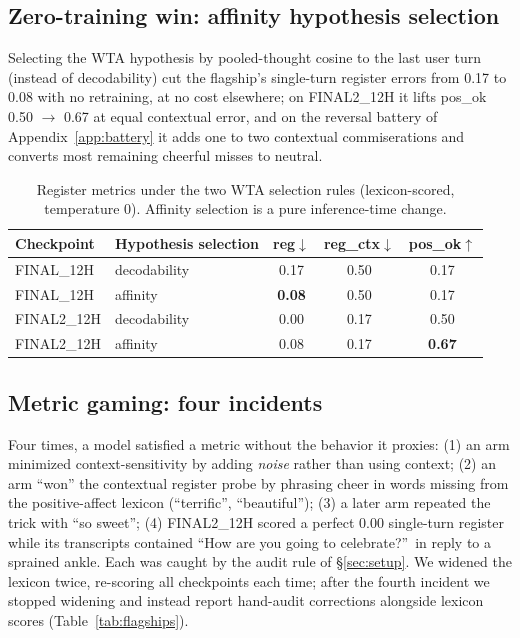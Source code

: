 \documentclass[11pt]{article}
\begin{document}
\subsection{Zero-training win: affinity hypothesis selection}
\label{sec:affinity}
Selecting the WTA hypothesis by pooled-thought cosine to the last user turn
(instead of decodability) cut the flagship's single-turn register errors from
0.17 to 0.08 with no retraining, at no cost elsewhere; on FINAL2\_12H it
lifts pos\_ok 0.50 $\to$ 0.67 at equal contextual error, and on the reversal
battery of Appendix~\ref{app:battery} it adds one to two contextual
commiserations and converts most remaining cheerful misses to neutral.

\begin{table}[h]
\centering
\small
\begin{tabular}{llccc}
\toprule
Checkpoint & Hypothesis selection & reg$\downarrow$ & reg\_ctx$\downarrow$ & pos\_ok$\uparrow$ \\
\midrule
FINAL\_12H  & decodability & 0.17 & 0.50 & 0.17 \\
FINAL\_12H  & affinity     & \textbf{0.08} & 0.50 & 0.17 \\
FINAL2\_12H & decodability & 0.00 & 0.17 & 0.50 \\
FINAL2\_12H & affinity     & 0.08 & 0.17 & \textbf{0.67} \\
\bottomrule
\end{tabular}
\caption{Register metrics under the two WTA selection rules (lexicon-scored,
temperature 0). Affinity selection is a pure inference-time change.}
\label{tab:affinity}
\end{table}

\subsection{Metric gaming: four incidents}
\label{sec:lessons}

Four times, a model satisfied a metric without the behavior it proxies:
(1) an arm minimized context-sensitivity by adding \emph{noise} rather than
using context; (2) an arm ``won'' the contextual register probe by phrasing
cheer in words missing from the positive-affect lexicon (``terrific'',
``beautiful''); (3) a later arm repeated the trick with ``so sweet''; (4)
FINAL2\_12H scored a perfect 0.00 single-turn register while its transcripts
contained ``How are you going to celebrate?''\ in reply to a sprained ankle.
Each was caught by the audit rule of \S\ref{sec:setup}. We widened the
lexicon twice, re-scoring all checkpoints each time; after the fourth
incident we stopped widening and instead report hand-audit corrections
alongside lexicon scores (Table~\ref{tab:flagships}).
\end{document}
